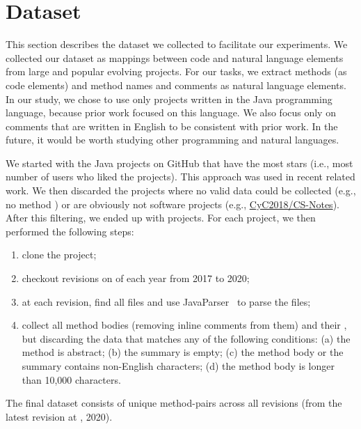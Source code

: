 \section{Dataset}
\label{sec:data}

This section describes the dataset we collected to facilitate our
experiments.  We collected our dataset as mappings between code and
natural language elements from large and popular evolving projects.
For our tasks, we extract methods (as code elements) and method names
and \javadoc comments as natural language elements.  In our study, we
chose to use only projects written in the Java programming language,
because  prior work focused on this language.  We also
focus only on comments that are written in English to be consistent
with prior work.  In the future, it would be worth studying other
programming and natural languages.


We started with the \NumProjectPlanned Java projects on GitHub that
have the most stars (i.e., most number of users who liked the
projects).  This approach was used in  recent related work.
We then discarded the projects where no valid data could be collected
(e.g., no method \javadoc) or are obviously not software projects
(e.g.,
\href{https://github.com/CyC2018/CS-Notes}{CyC2018/CS-Notes}). After
this filtering, we ended up with \NumProject projects.  For each
project, we then performed the following steps:
\begin{enumerate}
\item clone the project;
\item checkout revisions on \ajanone{} of each year from 2017 to 2020;
\item at each revision, find all  files and use
  JavaParser~\cite{JavaParser} to parse the files;
\item collect all method bodies (removing inline comments from them)
  and their \javadoc, but discarding the data that matches any of the
  following conditions: (a) the method is abstract; (b) the \javadoc
  summary is empty; (c) the method body or the \javadoc summary
  contains non-English characters; (d) the method body is longer than
  10,000 characters.
\end{enumerate}

The final dataset consists of \NumDataAll unique method-\javadoc pairs
across all \NumRevisionAll revisions (\NumDataLatest from the latest
revision at \ajanone{}, 2020).

